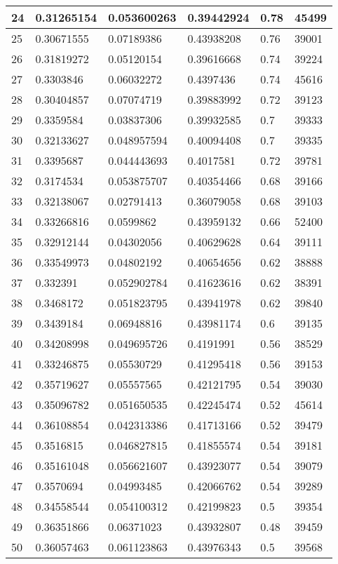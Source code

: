 \begin{longtable}{|l|l|l|l|l|l|}
24 & 0.31265154 & 0.053600263 & 0.39442924 & 0.78 & 45499 \\ \hline 
25 & 0.30671555 & 0.07189386 & 0.43938208 & 0.76 & 39001 \\ \hline 
26 & 0.31819272 & 0.05120154 & 0.39616668 & 0.74 & 39224 \\ \hline 
27 & 0.3303846 & 0.06032272 & 0.4397436 & 0.74 & 45616 \\ \hline 
28 & 0.30404857 & 0.07074719 & 0.39883992 & 0.72 & 39123 \\ \hline 
29 & 0.3359584 & 0.03837306 & 0.39932585 & 0.7 & 39333 \\ \hline 
30 & 0.32133627 & 0.048957594 & 0.40094408 & 0.7 & 39335 \\ \hline 
31 & 0.3395687 & 0.044443693 & 0.4017581 & 0.72 & 39781 \\ \hline 
32 & 0.3174534 & 0.053875707 & 0.40354466 & 0.68 & 39166 \\ \hline 
33 & 0.32138067 & 0.02791413 & 0.36079058 & 0.68 & 39103 \\ \hline 
34 & 0.33266816 & 0.0599862 & 0.43959132 & 0.66 & 52400 \\ \hline 
35 & 0.32912144 & 0.04302056 & 0.40629628 & 0.64 & 39111 \\ \hline 
36 & 0.33549973 & 0.04802192 & 0.40654656 & 0.62 & 38888 \\ \hline 
37 & 0.332391 & 0.052902784 & 0.41623616 & 0.62 & 38391 \\ \hline 
38 & 0.3468172 & 0.051823795 & 0.43941978 & 0.62 & 39840 \\ \hline 
39 & 0.3439184 & 0.06948816 & 0.43981174 & 0.6 & 39135 \\ \hline 
40 & 0.34208998 & 0.049695726 & 0.4191991 & 0.56 & 38529 \\ \hline 
41 & 0.33246875 & 0.05530729 & 0.41295418 & 0.56 & 39153 \\ \hline 
42 & 0.35719627 & 0.05557565 & 0.42121795 & 0.54 & 39030 \\ \hline 
43 & 0.35096782 & 0.051650535 & 0.42245474 & 0.52 & 45614 \\ \hline 
44 & 0.36108854 & 0.042313386 & 0.41713166 & 0.52 & 39479 \\ \hline 
45 & 0.3516815 & 0.046827815 & 0.41855574 & 0.54 & 39181 \\ \hline 
46 & 0.35161048 & 0.056621607 & 0.43923077 & 0.54 & 39079 \\ \hline 
47 & 0.3570694 & 0.04993485 & 0.42066762 & 0.54 & 39289 \\ \hline 
48 & 0.34558544 & 0.054100312 & 0.42199823 & 0.5 & 39354 \\ \hline 
49 & 0.36351866 & 0.06371023 & 0.43932807 & 0.48 & 39459 \\ \hline 
50 & 0.36057463 & 0.061123863 & 0.43976343 & 0.5 & 39568 \\ \hline 
\end{longtable}